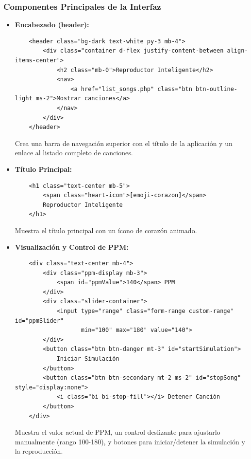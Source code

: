 \documentclass[a4paper,12pt]{article}
\begin{document}
\subsubsection{Componentes Principales de la Interfaz}
\begin{itemize}
    \item \textbf{Encabezado (header):}
    \begin{verbatim}
    <header class="bg-dark text-white py-3 mb-4">
        <div class="container d-flex justify-content-between align-items-center">
            <h2 class="mb-0">Reproductor Inteligente</h2>
            <nav>
                <a href="list_songs.php" class="btn btn-outline-light ms-2">Mostrar canciones</a>
            </nav>
        </div>
    </header>
    \end{verbatim}
    Crea una barra de navegación superior con el título de la aplicación y un enlace al listado completo de canciones.

    \item \textbf{Título Principal:}
    \begin{verbatim}
    <h1 class="text-center mb-5">
        <span class="heart-icon">[emoji-corazon]</span> 
        Reproductor Inteligente
    </h1>
    \end{verbatim}
    Muestra el título principal con un ícono de corazón animado.

    \item \textbf{Visualización y Control de PPM:}
    \begin{verbatim}
    <div class="text-center mb-4">
        <div class="ppm-display mb-3">
            <span id="ppmValue">140</span> PPM
        </div>
        <div class="slider-container">
            <input type="range" class="form-range custom-range" id="ppmSlider" 
                   min="100" max="180" value="140">
        </div>
        <button class="btn btn-danger mt-3" id="startSimulation">
            Iniciar Simulación
        </button>
        <button class="btn btn-secondary mt-2 ms-2" id="stopSong" style="display:none">
            <i class="bi bi-stop-fill"></i> Detener Canción
        </button>
    </div>
    \end{verbatim}
    Muestra el valor actual de PPM, un control deslizante para ajustarlo manualmente (rango 100-180), y botones para iniciar/detener la simulación y la reproducción.


\end{itemize}
\end{document}
